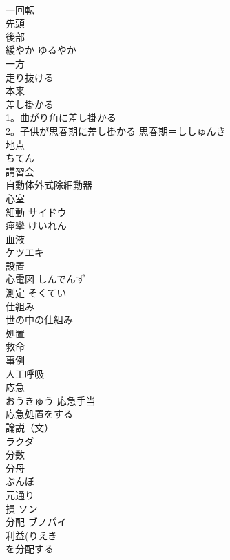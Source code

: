 \documentclass[8pt]{extreport}
\begin{document}
\begin{CJK}{UTF8}{min}
\\	一回転	
\\	先頭　
\\	後部	
\\	緩やか	ゆるやか 
\\	一方	
\\	走り抜ける	
\\	本来	
\\	差し掛かる	
\\	1。曲がり角に差し掛かる 
\\	2。子供が思春期に差し掛かる 思春期＝ししゅんき 
\\	地点	
\\	ちてん
\\	講習会	
\\	自動体外式除細動器	
\\	心室	
\\	細動	サイドウ 
\\	痙攣	けいれん 
\\	血液	
\\	ケツエキ
\\	設置	
\\	心電図	しんでんず 
\\	測定	そくてい 
\\	仕組み	
\\	世の中の仕組み 
\\	処置	
\\	救命	
\\	事例	
\\	人工呼吸	
\\	応急	
\\	おうきゅう 応急手当 
\\	応急処置をする 
\\	論説（文）	
\\	ラクダ	
\\	分数	
\\	分母	
\\	ぶんぼ
\\	元通り	
\\	損	ソン 
\\	分配	ブノパイ 
\\	利益(りえき 
\\	を分配する
\end{CJK}
\end{document}
